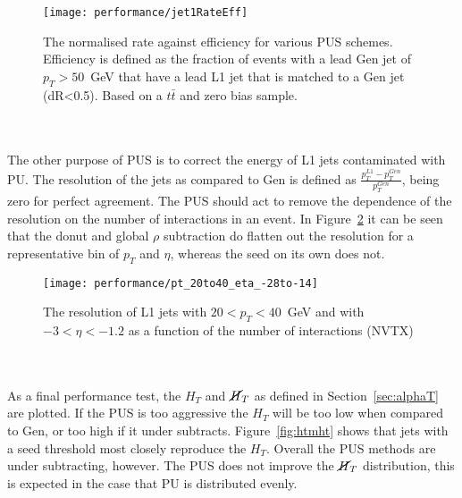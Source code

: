 \begin{figure}
	\begin{center}
		\texttt{[image: performance/jet1RateEff]}
	\end{center}
	\caption{The normalised rate against efficiency for various PUS schemes. Efficiency is defined as the fraction of events with a lead Gen jet of $p_T>50$~GeV that have a lead L1 jet that is matched to a Gen jet (dR<0.5). Based on a $t\bar{t}$ and zero bias sample.}
	\label{fig:rateeff}
\end{figure}
\\\\
\noindent The other purpose of PUS is to correct the energy of L1 jets contaminated with PU. The resolution of the jets as compared to Gen is defined as $\frac{p_T^{L1}-p_T^{Gen}}{p_T^{Gen}}$, being zero for perfect agreement. The PUS should act to remove the dependence of the resolution on the number of interactions in an event. In Figure~\ref{fig:resolution} it can be seen that the donut and global $\rho$ subtraction do flatten out the resolution for a representative bin of $p_T$ and $\eta$, whereas the seed on its own does not. 
\begin{figure}
	\begin{center}
		\texttt{[image: performance/pt\_20to40\_eta\_-28to-14]}
	\end{center}
	\caption{The resolution of L1 jets with $20<p_T<40$~GeV and with $-3<\eta<-1.2$ as a function of the number of interactions (NVTX)}
	\label{fig:resolution}
\end{figure}
\\\\
\noindent As a final performance test, the $H_T$ and $\cancel{H}_T$ as defined in Section~\ref{sec:alphaT} are plotted. If the PUS is too aggressive the $H_T$ will be too low when compared to Gen, or too high if it under subtracts. Figure~\ref{fig:htmht} shows that jets with a seed threshold most closely reproduce the $H_T$. Overall the PUS methods are under subtracting, however. The PUS does not improve the $\cancel{H}_T$ distribution, this is expected in the case that PU is distributed evenly.
